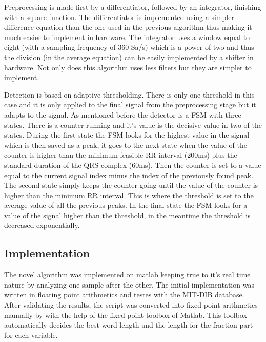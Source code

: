 \documentclass{article}
\begin{document}
Preprocessing is made first by a differentiator, followed by an integrator, finishing with a square function. The differentiator is implemented using a simpler difference equation than the one used in the previous algorithm thus making it much easier to implement in hardware. The integrator uses a window equal to eight (with a sampling frequency of 360 Sa/s) which is a power of two and thus the division (in the average equation) can be easily implemented by a shifter in hardware. Not only does this algorithm uses less filters but they are simpler to implement.

Detection is based on adaptive thresholding. There is only one threshold in this case and it is only applied to the final signal from the preprocessing stage but it adapts to the signal. As mentioned before the detector is a FSM with three states. There is a counter running and it's value is the decisive value in two of the states. During the first state the FSM looks for the highest value in the signal which is then saved as a peak, it goes to the next state when the value of the counter is higher than the minimum feasible RR interval (200ms) plus the standard duration of the QRS complex (60ms). Then the counter is set to a value equal to the current signal index minus the index of the previously found peak. The second state simply keeps the counter going  until the value of the counter is higher than the minimum RR interval. This is where the threshold is set to the average value of all the previous peaks. In the final state the FSM looks for a value of the signal higher than the threshold, in the meantime the threshold is decreased exponentially. 

\subsection{Implementation}

The novel algorithm was implemented on matlab keeping true to it's real time nature by analyzing one sample after the other. The initial implementation was written in floating point arithmetics and testes with the MIT-DIB database. After validating the results, the script was converted into fixed-point arithmetics manually by with the help of the fixed point toolbox of Matlab. This toolbox automatically decides the best word-length and the length for the fraction part for each variable. 
\end{document}
